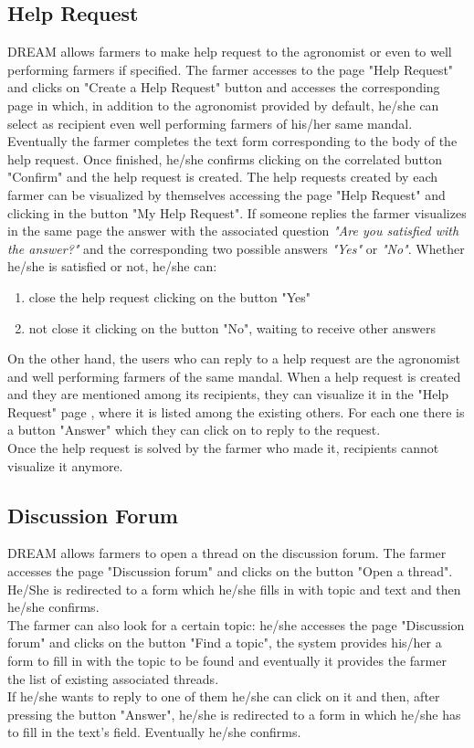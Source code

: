 \subsection{Help Request}
DREAM allows farmers to make help request to the agronomist or even to well performing farmers if specified. The farmer accesses to the page "Help Request" and clicks on "Create a Help Request" button and accesses the corresponding page in which, in addition to the agronomist provided by default, he/she can select as recipient even well performing farmers of his/her same mandal. Eventually the farmer completes the text form corresponding to the body of the help request. Once finished, he/she confirms clicking on the correlated button "Confirm" and the help request is created. The help requests created by each farmer can be visualized by themselves accessing the page "Help Request" and clicking in the button "My Help Request". If someone replies the farmer visualizes in the same page the answer with the associated question \textit{"Are you satisfied with the answer?"} and the corresponding two possible answers \textit{"Yes"} or \textit{"No"}. Whether he/she is satisfied or not, he/she can:
\begin{enumerate}
    \item close the help request clicking on the button "Yes"
    \item not close it clicking on the button "No", waiting to receive other answers
\end{enumerate}
On the other hand, the users who can reply to a help request are the agronomist and well performing farmers of the same mandal. When a help request is created and they are mentioned among its recipients, they can visualize it in the "Help Request" page , where it is listed among the existing others. For each one there is a button "Answer" which they can click on to reply to the request.\\
Once the help request is solved by the farmer who made it, recipients cannot visualize it anymore. 

\subsection{Discussion Forum}
DREAM allows farmers to open a thread on the discussion forum. The farmer accesses the page "Discussion forum" and clicks on the button "Open a thread". He/She is redirected to a form which he/she fills in with topic and text and then he/she confirms. \\
The farmer can also look for a certain topic: he/she accesses the page "Discussion forum" and clicks on the button "Find a topic", the system provides his/her a form to fill in with the topic to be found and eventually it provides the farmer the list of existing associated threads.\\
If he/she wants to reply to one of them he/she can click on it and then, after pressing the button "Answer", he/she is redirected to a form in which he/she has to fill in the text's field. Eventually he/she confirms.

